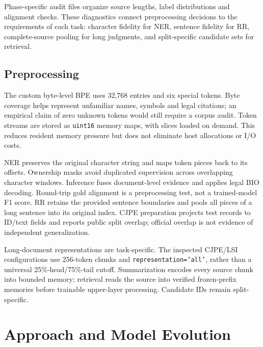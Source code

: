 \documentclass[11pt, oneside]{article}
\begin{document}
Phase-specific audit files organize source lengths, label distributions and alignment checks.
These diagnostics connect preprocessing decisions to the requirements of each task:
character fidelity for NER, sentence fidelity for RR, complete-source pooling for long
judgments, and split-specific candidate sets for retrieval.

\subsection{Preprocessing}
The custom byte-level BPE uses 32,768 entries and six special tokens. Byte coverage
helps represent unfamiliar names, symbols and legal citations; an empirical claim
of zero unknown tokens would still require a corpus audit. Token streams are stored
as \texttt{uint16} memory maps, with slices loaded on demand. This reduces resident
memory pressure but does not eliminate host allocations or I/O costs.

NER preserves the original character string and maps token pieces back to its offsets.
Ownership masks avoid duplicated supervision across overlapping character windows.
Inference fuses document-level evidence and applies legal BIO decoding. Round-trip
gold alignment is a preprocessing test, not a trained-model F1 score. RR retains the
provided sentence boundaries and pools all pieces of a long sentence into its original
index. CJPE preparation projects test records to ID/text fields and reports public
split overlap; official overlap is not evidence of independent generalization.

Long-document representations are task-specific. The inspected CJPE/LSI configurations
use 256-token chunks and \texttt{representation='all'}, rather than a universal
25\%-head/75\%-tail cutoff. Summarization encodes every source chunk into bounded
memory; retrieval reads the source into verified frozen-prefix memories before
trainable upper-layer processing. Candidate IDs remain split-specific.

\section{Approach and Model Evolution}
\end{document}
